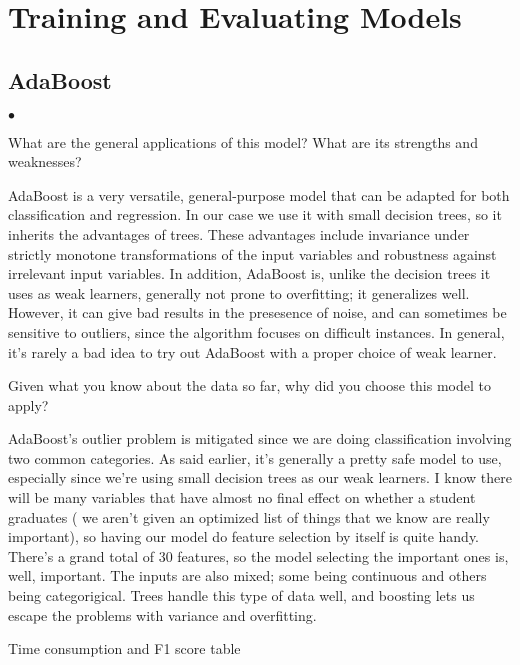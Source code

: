 \documentclass{amsart}
\begin{document}
\section{Training and Evaluating Models}
\subsection{AdaBoost}
\begin{list}{$\bullet$}{\addtolength{\parsep}{1mm}}
	\item What are the general applications of this model?  What are its strengths and weaknesses?

	AdaBoost is a very versatile, general-purpose model that can be adapted for both classification and regression.  In our case we use it with small decision trees, so it inherits
	the advantages of trees.   These advantages include invariance under strictly monotone transformations of the input variables and robustness against irrelevant
	input variables.  In addition, AdaBoost is, unlike the decision trees it uses as weak learners, generally not prone to overfitting; it generalizes well.
	However, it can give bad results in the presesence of noise, and can sometimes be sensitive to outliers, since the algorithm focuses on difficult instances.  
	In general, it's rarely a bad idea to try out AdaBoost with a proper choice of weak learner.

	\item Given what you know about the data so far, why did you choose this model to apply?
	
	AdaBoost's outlier problem is mitigated since we are doing classification involving two common categories.  As said earlier, it's generally a pretty safe model to use, especially
	since we're using small decision trees as our weak learners.  I know there will be many variables that have almost no final effect on whether a student graduates ( we aren't
	given an optimized list of things that we know are really important), so having our model do feature selection by itself is quite handy.  There's a grand total of 30 features,
	so the model selecting the important ones is, well, important.  The inputs are also mixed; some being continuous and others being categorigical.  Trees handle this type of
	data well, and boosting lets us escape the problems with variance and overfitting.

	\item Time consumption and F1 score table


\end{list}
\end{document}
